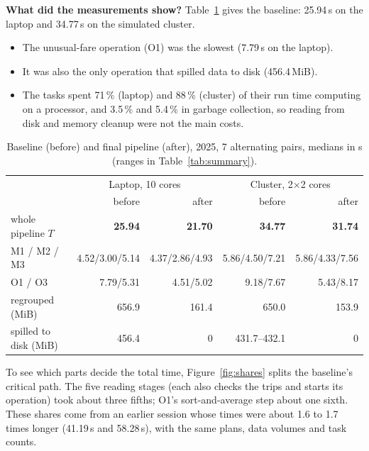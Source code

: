 \documentclass[sigconf]{acmart}
\newcommand{\mib}{\,MiB}
\newcommand{\s}{\,s}
\begin{document}
\textbf{What did the measurements show?} Table~\ref{tab:baseline} gives the baseline: 25.94\s{}
on the laptop and 34.77\s{} on the simulated cluster.
\begin{itemize}
\item The unusual-fare operation (O1) was the slowest (7.79\s{} on the laptop).
\item It was also the only operation that spilled data to disk (456.4\mib).
\item The tasks spent 71\,\% (laptop) and 88\,\% (cluster) of their run time computing on a
processor, and 3.5\,\% and 5.4\,\% in garbage collection, so reading from disk and memory
cleanup were not the main costs.
\end{itemize}

\begin{table}[h]
\caption{Baseline (before) and final pipeline (after), 2025, 7 alternating pairs, medians in s
(ranges in Table~\ref{tab:summary}).}
\label{tab:baseline}
\footnotesize\setlength{\tabcolsep}{3pt}
\begin{tabular}{@{}lrrrr@{}}
\toprule
 & \multicolumn{2}{c}{Laptop, 10 cores} & \multicolumn{2}{c}{Cluster, 2$\times$2 cores} \\
 & before & after & before & after \\
\midrule
whole pipeline $T$ & \textbf{25.94} & \textbf{21.70} & \textbf{34.77} & \textbf{31.74} \\
M1 / M2 / M3 & 4.52/3.00/5.14 & 4.37/2.86/4.93 & 5.86/4.50/7.21 & 5.86/4.33/7.56 \\
O1 / O3 & 7.79/5.31 & 4.51/5.02 & 9.18/7.67 & 5.43/8.17 \\
regrouped (MiB) & 656.9 & 161.4 & 650.0 & 153.9 \\
spilled to disk (MiB) & 456.4 & 0 & 431.7--432.1 & 0 \\
\bottomrule
\end{tabular}
\end{table}

To see which parts decide the total time, Figure~\ref{fig:shares} splits the baseline's
critical path. The five reading stages (each also checks the trips and starts its operation)
took about three fifths; O1's sort-and-average step about one sixth. These shares come from an
earlier session whose times were about 1.6 to 1.7 times longer (41.19\s{} and 58.28\s), with
the same plans, data volumes and task counts.
\end{document}
